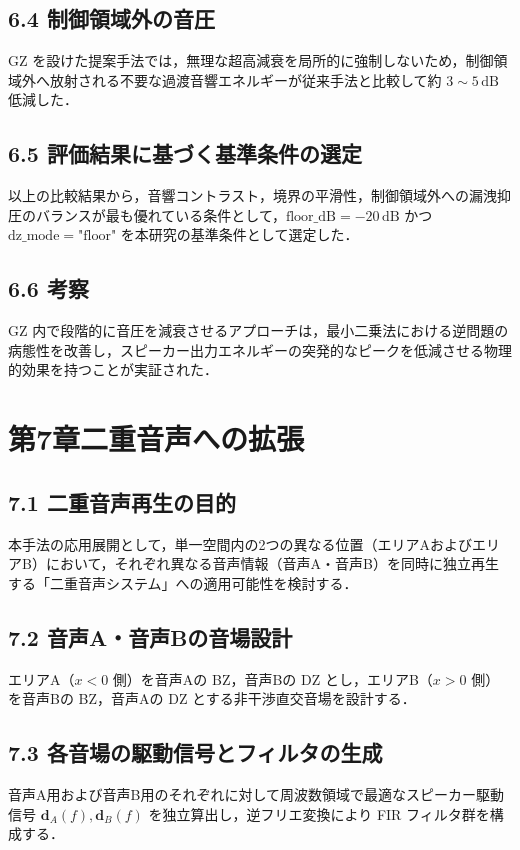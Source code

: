 \documentclass[11pt, a4paper]{article}
\begin{document}
\subsection{6.4 制御領域外の音圧}
GZ を設けた提案手法では，無理な超高減衰を局所的に強制しないため，制御領域外へ放射される不要な過渡音響エネルギーが従来手法と比較して約 $3 \sim 5\,\mathrm{dB}$ 低減した．

\subsection{6.5 評価結果に基づく基準条件の選定}
以上の比較結果から，音響コントラスト，境界の平滑性，制御領域外への漏洩抑圧のバランスが最も優れている条件として，$\mathrm{floor\_dB} = -20\,\mathrm{dB}$ かつ $\mathrm{dz\_mode} = \text{"floor"}$ を本研究の基準条件として選定した．

\subsection{6.6 考察}
GZ 内で段階的に音圧を減衰させるアプローチは，最小二乗法における逆問題の病態性を改善し，スピーカー出力エネルギーの突発的なピークを低減させる物理的効果を持つことが実証された．

\section{第7章{二重音声への拡張}}

\subsection{7.1 二重音声再生の目的}
本手法の応用展開として，単一空間内の2つの異なる位置（エリアAおよびエリアB）において，それぞれ異なる音声情報（音声A・音声B）を同時に独立再生する「二重音声システム」への適用可能性を検討する．

\subsection{7.2 音声A・音声Bの音場設計}
エリアA（$x < 0$ 側）を音声Aの BZ，音声Bの DZ とし，エリアB（$x > 0$ 側）を音声Bの BZ，音声Aの DZ とする非干渉直交音場を設計する．

\subsection{7.3 各音場の駆動信号とフィルタの生成}
音声A用および音声B用のそれぞれに対して周波数領域で最適なスピーカー駆動信号 $\mathbf{d}_A(f), \mathbf{d}_B(f)$ を独立算出し，逆フリエ変換により FIR フィルタ群を構成する．
\end{document}
